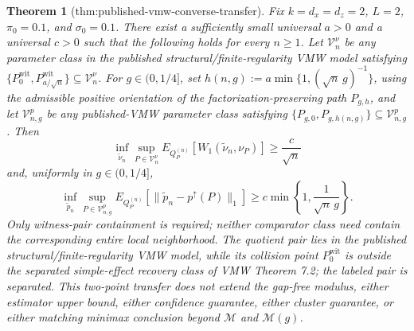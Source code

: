 \documentclass{article}
\newtheorem{theorem}{Theorem}
\begin{document}
\begin{theorem}[thm:published-vmw-converse-transfer]\label{thm:published-vmw-converse-transfer}
Fix \(k=d_x=d_z=2\), \(L=2\), \(\pi_0=0.1\), and \(\sigma_0=0.1\).  There exist a sufficiently small universal \(a>0\) and a universal \(c>0\) such that the following holds for every \(n\ge1\).  Let \(\mathcal V_n^\nu\) be any parameter class in the published structural/finite-regularity VMW model satisfying \(\{P_0^{\mathrm{wit}},P_{a/\sqrt n}^{\mathrm{wit}}\}\subseteq\mathcal V_n^\nu\).  For \(g\in(0,1/4]\), set \(h(n,g):=a\min\{1,(\sqrt n\,g)^{-1}\}\), using the admissible positive orientation of the factorization-preserving path \(P_{g,h}\), and let \(\mathcal V_{n,g}^{p}\) be any published-VMW parameter class satisfying \(\{P_{g,0},P_{g,h(n,g)}\}\subseteq\mathcal V_{n,g}^{p}\).  Then
\[
\inf_{\widetilde\nu_n}\sup_{P\in\mathcal V_n^\nu}
E_{Q_P^{(n)}}[W_1(\widetilde\nu_n,\nu_P)]\ge\frac c{\sqrt n}
\]
and, uniformly in \(g\in(0,1/4]\),
\[
\inf_{\widetilde p_n}\sup_{P\in\mathcal V_{n,g}^{p}}
E_{Q_P^{(n)}}[\lVert\widetilde p_n-p^{\uparrow}(P)\rVert_1]
\ge c\min\left\{1,\frac1{\sqrt n\,g}\right\}.
\]
Only witness-pair containment is required; neither comparator class need contain the corresponding entire local neighborhood.  The quotient pair lies in the published structural/finite-regularity VMW model, while its collision point \(P_0^{\mathrm{wit}}\) is outside the separated simple-effect recovery class of VMW Theorem 7.2; the labeled pair is separated.  This two-point transfer does not extend the gap-free modulus, either estimator upper bound, either confidence guarantee, either cluster guarantee, or either matching minimax conclusion beyond \(\mathcal M\) and \(\mathcal M(g)\).
\end{theorem}
\end{document}
